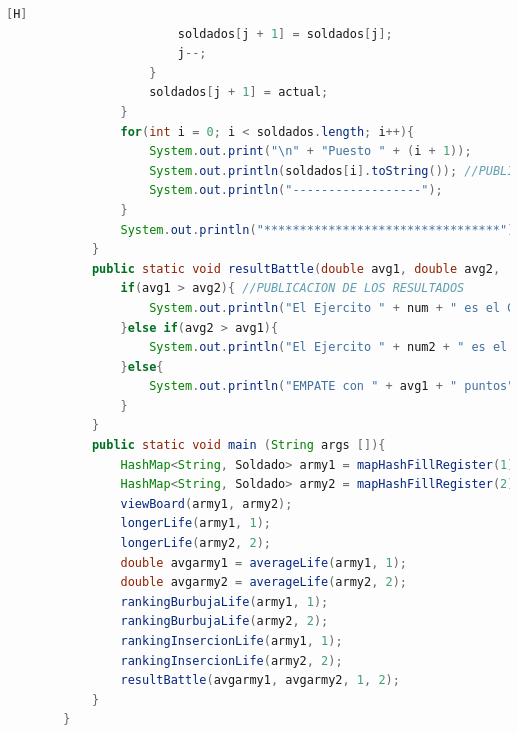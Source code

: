 \documentclass{article}
\begin{document}
\begin{lstlisting}[language=java,caption={Las lineas de codigos del metodo creado:}][H]
						soldados[j + 1] = soldados[j];
						j--;
					}
					soldados[j + 1] = actual;
				}
				for(int i = 0; i < soldados.length; i++){
					System.out.print("\n" + "Puesto " + (i + 1));
					System.out.println(soldados[i].toString()); //PUBLICAMOS RESULTADOS
					System.out.println("------------------");
				}
				System.out.println("*********************************");
			}
			public static void resultBattle(double avg1, double avg2,  int num, int num2){ //METODO CREADO PARA PODER SABER EL RESULTADO DE ESTA BATALLA ENTRE ESTOS 2 EJERCITOS
				if(avg1 > avg2){ //PUBLICACION DE LOS RESULTADOS
					System.out.println("El Ejercito " + num + " es el GANADOR con " + avg1+ " puntos");
				}else if(avg2 > avg1){
					System.out.println("El Ejercito " + num2 + " es el GANADOR con " + avg2 + " puntos");
				}else{
					System.out.println("EMPATE con " + avg1 + " puntos");
				}
			}
			public static void main (String args []){
				HashMap<String, Soldado> army1 = mapHashFillRegister(1);
				HashMap<String, Soldado> army2 = mapHashFillRegister(2);
				viewBoard(army1, army2);
				longerLife(army1, 1);
				longerLife(army2, 2);
				double avgarmy1 = averageLife(army1, 1);
				double avgarmy2 = averageLife(army2, 2);
				rankingBurbujaLife(army1, 1);
				rankingBurbujaLife(army2, 2);
				rankingInsercionLife(army1, 1);
				rankingInsercionLife(army2, 2);
				resultBattle(avgarmy1, avgarmy2, 1, 2);
			}
		}
	\end{lstlisting}
\end{document}
